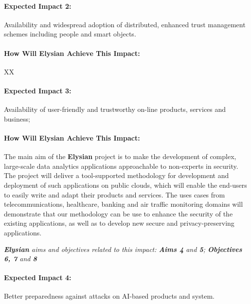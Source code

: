 \documentclass[a4paper,11pt]{article}
\newcommand{\project}[1]{\textbf{#1}\xspace}
\newcommand{\SECURITY}{\project{Elysian}}
\newcommand{\TheProject}{\SECURITY}
\begin{document}
\begin{mdframed}[backgroundcolor=blue!5]
\paragraph{Expected Impact 2:}
Availability and widespread adoption of distributed, enhanced trust management schemes including people and smart objects.
\end{mdframed}

\begin{mdframed}[backgroundcolor=gray!10]
\paragraph{How Will \TheProject{} Achieve This Impact:}
XX
\end{mdframed}

\begin{mdframed}[backgroundcolor=blue!5]
\paragraph{Expected Impact 3:}
Availability of user-friendly and trustworthy on-line products, services and business;
\end{mdframed}

\begin{mdframed}[backgroundcolor=gray!10]
\paragraph{How Will \TheProject{} Achieve This Impact:}
The main aim of the \TheProject{} project is to make the development of complex, large-scale data analytics applications approachable to non-experts in security. The project will deliver a tool-supported methodology for development and deployment of such applications on public clouds, which will enable the end-users to easily write and adapt their products and services. The uses cases from telecommunications, healthcare, banking and air traffic monitoring domains will demonstrate that our methodology can be use to enhance the security of the existing applications, as well as to develop new secure and privacy-preserving applications.

\emph{\TheProject{} aims and objectives related to this impact: \textbf{Aims 4}  and \textbf{5}; \textbf{Objectives 6, 7} and \textbf{8} }

\end{mdframed}

\begin{mdframed}[backgroundcolor=blue!5]
\paragraph{Expected Impact 4:}
Better preparedness against attacks on AI-based products and system.
\end{mdframed}
\end{document}

